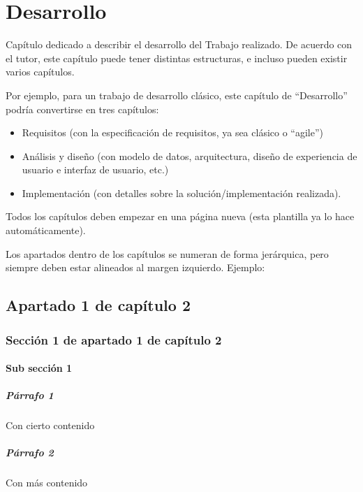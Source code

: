 \chapter{Desarrollo}
Capítulo dedicado a describir el desarrollo del Trabajo realizado. De acuerdo con el tutor, este capítulo puede tener distintas estructuras, e incluso pueden existir varios capítulos.

Por ejemplo, para un trabajo de desarrollo clásico, este capítulo de ``Desarrollo'' podría convertirse en tres capítulos:

\begin{itemize}
\item Requisitos (con la especificación de requisitos, ya sea clásico o ``agile'')
\item Análisis y diseño (con  modelo de datos, arquitectura, diseño de experiencia de usuario e interfaz de usuario, etc.)
\item Implementación (con detalles sobre la solución/implementación realizada).
\end{itemize}

Todos los capítulos deben empezar en una página nueva (esta plantilla ya lo hace automáticamente).

Los apartados dentro de los capítulos se numeran de forma jerárquica, pero siempre deben estar alineados al margen izquierdo. Ejemplo:

\section{Apartado 1 de capítulo 2}

\subsection{Sección 1 de apartado 1 de capítulo 2}

\subsubsection{Sub sección 1}

\paragraph{Párrafo 1} Con cierto contenido

\paragraph{Párrafo 2} Con más contenido

